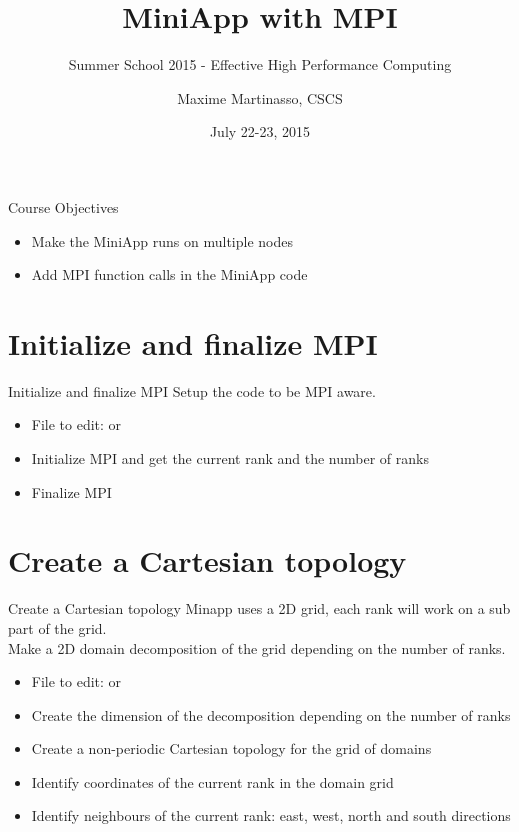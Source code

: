 \documentclass[aspectratio=43]{beamer}
\author{Maxime Martinasso, CSCS}
\title{MiniApp with MPI}
\subtitle{Summer School 2015 - Effective High Performance Computing}
\date{July 22-23, 2015}
\begin{document}
\cscstitle

\begin{frame}{Course Objectives}
\begin{itemize}
\item Make the MiniApp runs on multiple nodes
\item Add MPI function calls in the MiniApp code
\end{itemize}
\end{frame}



\section{Initialize and finalize MPI}
\begin{frame}[fragile]{Initialize and finalize MPI}
Setup the code to be MPI aware.
\begin{itemize}
\item File to edit:  or 
\item Initialize MPI and get the current rank and the number of ranks
\item Finalize MPI
\end{itemize}
\end{frame}

\section{Create a Cartesian topology}
\begin{frame}[fragile]{Create a Cartesian topology}
Minapp uses a 2D grid, each rank will work on a sub part of the grid.\\
Make a 2D domain decomposition of the grid depending on the number of ranks.\\
\begin{itemize}
\item File to edit:  or 
\item Create the dimension of the decomposition depending on the number of ranks
\item Create a non-periodic Cartesian topology for the grid of domains
\item Identify coordinates of the current rank in the domain grid
\item Identify neighbours of the current rank: east, west, north and south directions
\end{itemize}
\end{frame}
\end{document}
